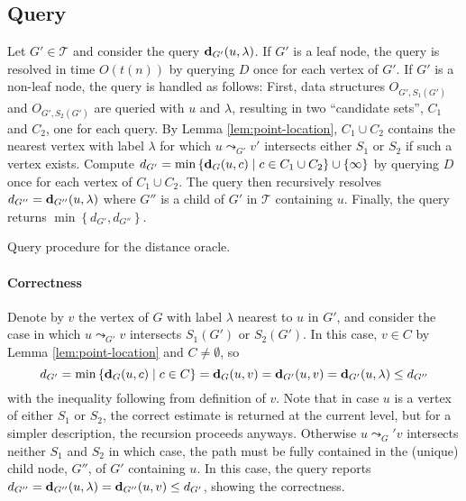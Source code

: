 \documentclass[a4paper,UKenglish,cleveref, autoref, thm-restate]{article}
\newcommand{\dist}[2]{\ensuremath{\normalfont{\textbf{d}}_{#1}({#2})}}
\begin{document}
\subsection{Query} 
Let $G' \in \mathcal{T}$ and consider the query $\dist{G'}{u,\lambda}$. If $G'$ is a leaf node, the query is resolved in time $O(t(n))$ by querying $D$ once for each vertex of $G'$. If $G'$ is a non-leaf node, the query is handled as follows: First, data structures $O_{G',S_1(G')}$ and $O_{G',S_2(G')}$ are queried with $u$ and $\lambda$, resulting in two ``candidate sets'', $C_1$ and $C_2$, one for each query. By Lemma \ref{lem:point-location}, $C_1 \cup C_2$ contains the nearest vertex with label $\lambda$ for which $u \leadsto_{G'} v'$ intersects either $S_1$ or $S_2$ if such a vertex exists. Compute $d_{G'} = \min \left\{ \dist{G}{u,c} \; | \; c \in C_1 \cup C_2 \right\} \cup \left\{ \infty \right\}$ by querying $D$ once for each vertex of $C_1 \cup C_2$. The query then recursively resolves $d_{G''} = \dist{G''}{u,\lambda}$ where $G''$ is a child of $G'$ in $\mathcal{T}$ containing $u$. Finally, the query returns $\min \left\{ d_{G'}, d_{G''} \right\}$. 

\begin{algorithm}[!hbt]
\caption{Query procedure for the distance oracle.}
\begin{algorithmic}[1]
    \State{\Return{$\min\left\{ \dist{G'}{u,v} \; | \; v \in V(G') \text{ and } l(v) = \lambda \right\}$}}
  \Else
    \State{$d_{G'} \gets \min \left\{ \dist{G}{u,c} \; | \; c \in C_1 \cup C_2 \right\} \cup \left\{ \infty \right\}$}
 \EndIf
\EndProcedure
\end{algorithmic}
\label{alg:final-query}
\end{algorithm}

\paragraph*{Correctness} Denote by $v$ the vertex of $G$ with label $\lambda$ nearest to $u$ in $G'$, and consider the case in which $u \leadsto_{G'} v$ intersects $S_1(G')$ or $S_2(G')$. In this case, $v \in C$ by Lemma \ref{lem:point-location} and $C \neq \emptyset$, so $$d_{G'} = \min \left\{ \dist{G}{u,c} \; | \; c \in C \right\} = \dist{G}{u,v} = \dist{G'}{u,v}  = \dist{G'}{u,\lambda} \leq d_{G''}$$
with the inequality following from definition of $v$. Note that in case $u$ is a vertex of either $S_1$ or $S_2$, the correct estimate is returned at the current level, but for a simpler description, the recursion proceeds anyways. Otherwise $u \leadsto_G' v$ intersects neither $S_1$ and $S_2$ in which case, the path must be fully contained in the (unique) child node, $G''$, of $G'$ containing $u$. In this case, the query reports $d_{G''} = \dist{G''}{u,\lambda} = \dist{G''}{u,v} \leq d_{G'}$, showing the correctness.
\end{document}
